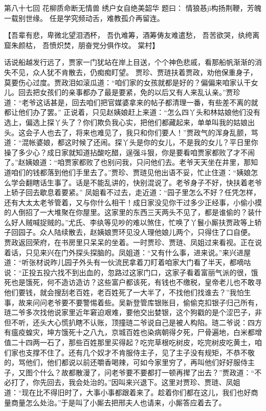\documentclass[12pt,oneside]{book}
\begin{document}
 
第八十七回 花柳质命断无情兽 绣户女自绝美韶华
题曰：
情狼惎jì构扬荆鞭，芳魄一载别世缘。
任是学究频动舌，难教孤介再留连。

【吾辈有悲，卑微北望泪洒杯，
吾仇难筹，酒筹俦友难遣愁，
吾苦欲哭，纨绔离窟朱颜枯，
吾愤炽焚，朋奋党分俱作坟。
棠村】

话说船越发行远了，贾家一门犹站在岸上目送，个个神色悲戚，看那船帆渐渐的消失不见，众人犹不肯散去，仍痴痴盯望。
贾珍、贾琏扶着贾政，劝他保重身子，莫要伤心过度。贾政泪如滚瓜道：“咱们家的女孩就都是好的？偏偏来咱家认干女儿。回去把女孩们的亲事都办了最是要紧，免的以后又有人来乱认亲。”贾珍道：“老爷这话甚是，回去咱们把官媒婆拿来的帖子都清理一番，有些差不离的就都让他们办了罢。”
正说着，只见赵姨娘赶上来道：“怎么四丫头和林姑娘他们没有选上，偏选上探丫头了？你们欺负我心实，把他们都藏起来，单单叫我的姑娘出头。这会子人也去了，将来也难见了，我只和你们要人！”贾政气的浑身乱颤，骂道：“混帐婆娘，都这时候了还闹。探丫头是你的女儿，不是我的女儿？平日里你操了多少心？成日家就知道拈酸吃醋，逞强斗狠，你是要看咱贾家都败了才不闹了。”赵姨娘道：“咱贾家都败了也别问我，只问他们去。老爷天天坐在井里，那知道咱们的钱都落到他们手里去了。”贾珍、贾琏见他出语不妥，忙止住道：“姨娘怎么学会翻瞎话生事了。话是不能乱讲的，快别混说了。老爷身子不好，快扶着老爷上轿子回去歇息着要紧。”
凤姐看不过去，走近道：“园子里怎么不好？任凭怎样，还有大太太老爷管着，又与你什么相干！成日家没见你干过多少正经事，小偷小摸的人倒招了一大堆聚在你屋里。这家里的东西三天两头不见了，都是谁偷的？装什么好人贼喊捉贼的。”尤氏、李纨等见吵的难以煞住，忙唤了丫鬟小厮扶贾政等上轿子回园子。众人陆续散去，赵姨娘贾环见没人理他娘儿两个，只得住了口自便。
贾政返回荣府，在书房里只呆呆的坐着。一时贾珍、贾琏、凤姐过来看视。正在说着话，只见来兴在门外探头探脑的。凤姐道：“又有什么事，进来说。”来兴进屋道：“听张材说昨儿园子外头有一伙流民拿着刀盯着咱家大门看了半天，都嘀咕说：“正投五投六找不到出血的，忽路过这家门口，这家子看着富丽气派的很，饿死也是饿死，何不造访造访？这些富户都该死，有钱也不缴税，皇帝老儿也不敢寻他们要钱，就会搜刮老百姓，老百姓死了一大半了，不找他们找谁去？”我怕生事，故来问问老爷要不要警惕着些。吴新登管库银账目，偷偷克扣银子归己所有，琏二爷多次找他说家里近年窘迫艰难，要他交出婪银，这个狗戳的是个涩巴子，非但不听，还头大心慌扒瞎不认账，顶撞琏二爷说自己是被人构陷。琏二爷说：四方有瘟疫蝗灾，坤方饿死十之八九，京城百姓也染病朝得夕死，尸骨遍地，白米都增值二十四两一石了，那些百姓那里买得起？吃完草根吃树皮，吃完树皮吃黄土，咱们家也支撑不住了。还有几个奴才不肯服侍主子，见了主子没有规矩，不恭不敬的，骂他们，他们都说以前还嚼香喝辣，可如今家里穷了，再叫他们好好服侍主子，又图个什么？故都散漫了，问老爷要不要都打一顿再撵了出去？”贾政道：“不必打了，你先回去，我会处治的。”因叫来兴退下。这里对贾珍、贾琏、凤姐道：“现在比不得旧时了，大事小事都跟着来了。趁着你们都在这儿，我们也好商量商量怎么处治。”于是叫了小厮去把邢夫人也请来，小厮答应着去了。
\end{document}
